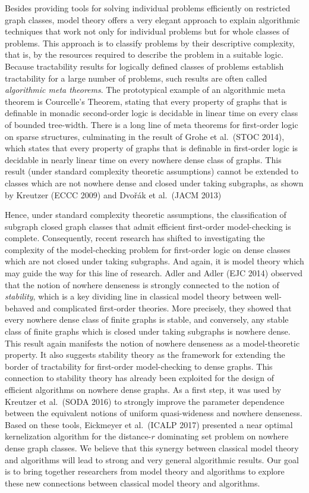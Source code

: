 Besides providing tools for solving
individual problems efficiently on restricted graph classes, 
model theory offers a very elegant 
approach to explain algorithmic techniques that work not only for 
individual problems but for whole classes of problems. This
approach is to classify problems by their descriptive complexity, 
that is, by the resources required to describe the problem in a 
suitable logic. Because tractability results for logically defined 
classes of problems establish tractability for a large number of
problems, such results are often called \emph{algorithmic meta theorems}. The prototypical example of an algorithmic
meta theorem is Courcelle’s Theorem, stating that 
every property of graphs that is definable in monadic second-order 
logic is decidable in linear time on every class of bounded tree-width.
There is a long line of meta theorems for first-order logic on sparse
structures, culminating in the result of Grohe et al.\ (STOC 2014), which states
that every property of graphs that is definable in first-order logic 
is decidable in nearly linear time on every nowhere dense class 
of graphs. This result (under standard complexity theoretic
assumptions) cannot be extended to
classes which are not nowhere dense and closed under taking
subgraphs, as shown by Kreutzer (ECCC 2009) and Dvo\v{r}\'ak et al.\ (JACM 2013)

Hence, under
standard complexity theoretic assumptions, the classification of
subgraph closed graph classes that admit efficient first-order 
model-checking is complete. Consequently, recent research 
has shifted to investigating the complexity of the model-checking
problem for first-order logic on dense classes which are not closed 
under taking subgraphs. And again, it is model theory which may
guide the way for this line of research. Adler and Adler (EJC 2014) observed
that the notion of nowhere denseness is strongly connected 
to the notion of \emph{stability}, which is a key dividing line 
in classical model theory between well-behaved and complicated 
first-order theories. More precisely, they showed that 
every nowhere dense class of finite graphs is stable, and conversely,
any stable class of finite graphs which is closed under taking 
subgraphs is nowhere dense. This result again manifests the notion of
nowhere denseness as a model-theoretic property. It also suggests 
stability theory as the framework for extending the border of 
tractability for first-order model-checking to dense graphs. 
This connection to stability theory has already been exploited for
the design of efficient algorithms on nowhere dense graphs. 
As a first step, it was used by Kreutzer et al.\ (SODA 2016) 
to strongly improve 
the parameter dependence between the equivalent notions of 
uniform quasi-wideness and nowhere denseness. Based on these
tools, Eickmeyer et al.\ (ICALP 2017) presented a near optimal 
kernelization algorithm for the distance-$r$ dominating set problem
on nowhere dense graph classes. We believe that this synergy 
between classical model theory and algorithms will lead to 
strong and very general algorithmic results. Our goal is to bring
together researchers from model theory and algorithms to 
explore these new connections between classical model theory
and algorithms. 